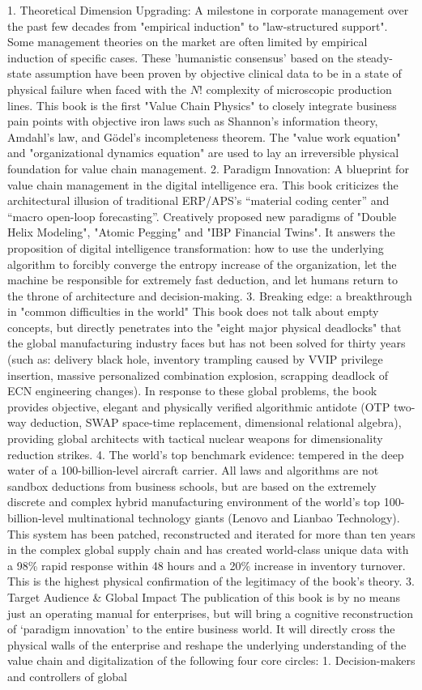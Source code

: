 \documentclass[11pt,a4paper]{article}
\begin{document}
1. Theoretical Dimension Upgrading: A milestone in corporate management over the past few decades from "empirical induction" to "law-structured support". Some management theories on the market are often limited by empirical induction of specific cases. These 'humanistic consensus' based on the steady-state assumption have been proven by objective clinical data to be in a state of physical failure when faced with the $N!$ complexity of microscopic production lines. This book is the first "Value Chain Physics" to closely integrate business pain points with objective iron laws such as Shannon's information theory, Amdahl's law, and Gödel's incompleteness theorem. The "value work equation" and "organizational dynamics equation" are used to lay an irreversible physical foundation for value chain management. 2. Paradigm Innovation: A blueprint for value chain management in the digital intelligence era. This book criticizes the architectural illusion of traditional ERP/APS’s “material coding center” and “macro open-loop forecasting”. Creatively proposed new paradigms of "Double Helix Modeling", "Atomic Pegging" and "IBP Financial Twins". It answers the proposition of digital intelligence transformation: how to use the underlying algorithm to forcibly converge the entropy increase of the organization, let the machine be responsible for extremely fast deduction, and let humans return to the throne of architecture and decision-making. 3. Breaking edge: a breakthrough in "common difficulties in the world" This book does not talk about empty concepts, but directly penetrates into the "eight major physical deadlocks" that the global manufacturing industry faces but has not been solved for thirty years (such as: delivery black hole, inventory trampling caused by VVIP privilege insertion, massive personalized combination explosion, scrapping deadlock of ECN engineering changes). In response to these global problems, the book provides objective, elegant and physically verified algorithmic antidote (OTP two-way deduction, SWAP space-time replacement, dimensional relational algebra), providing global architects with tactical nuclear weapons for dimensionality reduction strikes. 4. The world's top benchmark evidence: tempered in the deep water of a 100-billion-level aircraft carrier. All laws and algorithms are not sandbox deductions from business schools, but are based on the extremely discrete and complex hybrid manufacturing environment of the world's top 100-billion-level multinational technology giants (Lenovo and Lianbao Technology). This system has been patched, reconstructed and iterated for more than ten years in the complex global supply chain and has created world-class unique data with a 98\% rapid response within 48 hours and a 20\% increase in inventory turnover. This is the highest physical confirmation of the legitimacy of the book's theory. 3. Target Audience \& Global Impact The publication of this book is by no means just an operating manual for enterprises, but will bring a cognitive reconstruction of ‘paradigm innovation’ to the entire business world. It will directly cross the physical walls of the enterprise and reshape the underlying understanding of the value chain and digitalization of the following four core circles: 1. Decision-makers and controllers of global 
\end{document}
